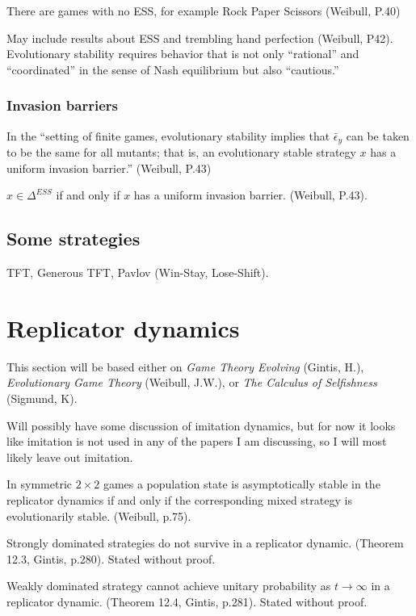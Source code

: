 There are games with no ESS, for example Rock Paper Scissors (Weibull, P.40)

May include results about ESS and trembling hand perfection (Weibull, P42). Evolutionary stability requires behavior that is not only ``rational'' and ``coordinated'' in the sense of Nash equilibrium but also ``cautious.''

\subsubsection{Invasion barriers}
In the ``setting of finite games, evolutionary stability implies that $\bar{\epsilon}_y$ can be taken to be the same for all mutants; that is, an evolutionary stable strategy $x$ has a uniform invasion barrier.'' (Weibull, P.43)
\begin{proposition}
$x \in \Delta^{ESS}$ if and only if $x$ has a uniform invasion barrier. (Weibull, P.43).
\end{proposition}


\subsection{Some strategies}
TFT, Generous TFT, Pavlov (Win-Stay, Lose-Shift).

\section{Replicator dynamics}
This section will be based either on \emph{Game Theory Evolving} (Gintis, H.), \emph{Evolutionary Game Theory} (Weibull, J.W.), or \emph{The Calculus of Selfishness} (Sigmund, K).

Will possibly have some discussion of imitation dynamics, but for now it looks like imitation is not used in any of the papers I am discussing, so I will most likely leave out imitation.
\begin{theorem}
In symmetric $2 \times 2$ games a population state is asymptotically stable in the replicator dynamics if and only if the corresponding mixed strategy is evolutionarily stable. (Weibull, p.75).
\end{theorem}

\begin{theorem}
Strongly dominated strategies do not survive in a replicator dynamic. (Theorem 12.3, Gintis, p.280). Stated without proof.
\end{theorem}
\begin{theorem}
Weakly dominated strategy cannot achieve unitary probability as $t \rightarrow \infty$ in a replicator dynamic. (Theorem 12.4, Gintis, p.281). Stated without proof.
\end{theorem}

